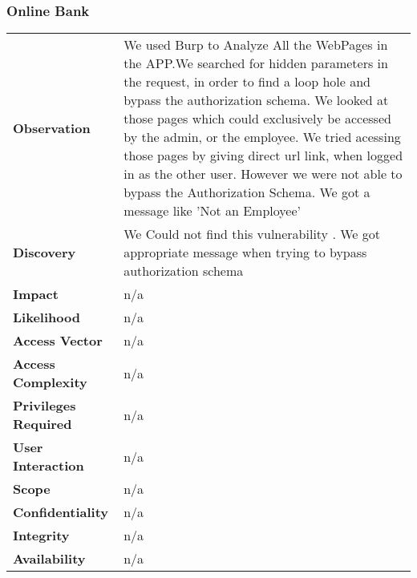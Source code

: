 \subsubsection{Online Bank}
\begin{tabular}{l|p{10cm}}
\textbf{Observation} & We used Burp to Analyze All the WebPages in the APP.We searched for hidden parameters in the request, in order to find a loop hole and bypass the authorization schema. We looked at those pages which could exclusively be accessed by the admin, or the employee. We tried acessing those pages by giving direct url link, when logged in as the other user. However we were not able to bypass the Authorization Schema. We got a message like 'Not an Employee'  \\
\textbf{Discovery} & We Could not find this vulnerability . We got appropriate message when trying to bypass authorization schema \\
\textbf{Impact} &  n/a\\
\textbf{Likelihood} & n/a \\
\textbf{Access Vector} & n/a \\
\textbf{Access Complexity} & n/a \\
\textbf{Privileges Required} & n/a \\
\textbf{User Interaction} & n/a \\
\textbf{Scope} & n/a \\
\textbf{Confidentiality} & n/a \\
\textbf{Integrity} & n/a \\
\textbf{Availability} & n/a \\
\end{tabular}

